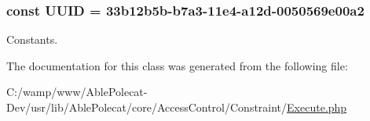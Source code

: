 \subsubsection[{U\+U\+I\+D}]{\setlength{\rightskip}{0pt plus 5cm}const U\+U\+I\+D = \textquotesingle{}33b12b5b-\/b7a3-\/11e4-\/a12d-\/0050569e00a2\textquotesingle{}}\label{class_able_polecat___access_control___constraint___execute_a74b892c8c0b86bf9d04c5819898c51e7}
Constants. 

The documentation for this class was generated from the following file\+:\begin{DoxyCompactItemize}
\item 
C\+:/wamp/www/\+Able\+Polecat-\/\+Dev/usr/lib/\+Able\+Polecat/core/\+Access\+Control/\+Constraint/\hyperlink{_execute_8php}{Execute.\+php}\end{DoxyCompactItemize}
